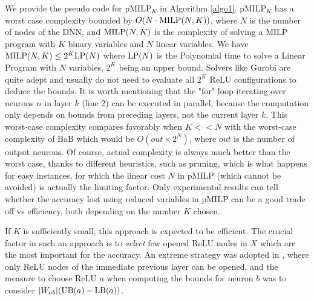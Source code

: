 We provide the pseudo code for pMILP$_K$ in Algorithm \ref{algo1}.
pMILP$_K$ has a worst case complexity bounded by $O(N \cdot {\textrm{MILP}}(N,K))$, 
where $N$ is the number of nodes of the DNN, and ${\textrm{MILP}}(N,K)$ is the complexity of solving a MILP program with $K$ {binary variables} and $N$ linear variables.
We have ${\textrm{MILP}}(N,K) \leq 2^K {\textrm{LP}}(N)$ where ${\textrm{LP}}(N)$ is the Polynomial time to solve a Linear Program with $N$ variables, $2^K$ being an upper bound. Solvers like Gurobi are quite adept and usually do not need to evaluate all $2^K$ ReLU configurations to deduce the bounds.
It is worth mentioning that the "for" loop iterating over neurons $n$ in layer $k$ (line 2) can be executed in parallel, because the computation only depends on bounds from preceding layers, not the current layer $k$. This worst-case complexity compares favorably when $K<<N$ with the worst-case complexity of BaB which would be $O(out \times 2^N)$, where $out$ is the number of output neurons. Of course, actual complexity is always much better than the worst case, thanks to different heuristics, such as pruning, which is what happens for easy instances, for which the linear cost $N$ in pMILP (which cannot be avoided) is actually the limiting factor. Only experimental results can tell whether the accuracy lost using reduced variables in pMILP can be a good trade off vs efficiency, both depending on the number $K$ chosen.


If $K$ is sufficiently small, 
this approach is expected to be efficient. 
The crucial factor in such an approach is to {\em select} few opened ReLU nodes in $X$ which are the most important for the accuracy. An extreme strategy was adopted in 
\cite{DivideAndSlide}, where only ReLU nodes of the immediate previous layer can be opened, and the measure to choose ReLU $a$ when computing the bounds for neuron $b$ was to consider $|W_{ab}| (\mathrm{UB}(a)-\mathrm{LB}(a))$. 
